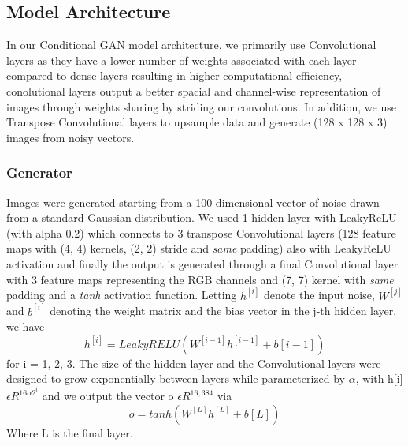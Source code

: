 \documentclass[conference]{IEEEtran}
\begin{document}
\subsection{Model Architecture}
In our Conditional GAN model architecture, we primarily use Convolutional layers as they have a lower number of weights associated with each layer compared to dense layers resulting in higher computational efficiency, conolutional layers output a better spacial and channel-wise representation of images through weights sharing by striding our convolutions. In addition, we use Transpose Convolutional layers to upsample data and generate (128 x 128 x 3) images from noisy vectors. 


\subsubsection{Generator}%
Images were generated starting from a 100-dimensional vector of noise drawn from a standard Gaussian distribution. We used 1 hidden layer with LeakyReLU (with alpha 0.2) which connects to 3 transpose Convolutional layers (128 feature maps with (4, 4) kernels, (2, 2) stride and \textit{same} padding) also with LeakyReLU activation and finally the output is generated through a final Convolutional layer with 3 feature maps representing the RGB channels and (7, 7) kernel with \textit{same} padding and a \textit{tanh} activation function. Letting \begin{math}h^[i]\end{math} denote the input noise, \begin{math}W^{[j]}\end{math} and \begin{math}b^{[i]}\end{math} denoting the weight matrix and the bias vector in the j-th hidden layer, we have
\begin{equation}
h^{[i]} = LeakyRELU(W^{[i-1]}h^{[i-1]}+b{[i-1]})\label{Gen LeakyRELU}
\end{equation}
for i = 1, 2, 3. The size of the hidden layer and the Convolutional layers were designed to grow exponentially between layers while parameterized
by \begin{math}\alpha \end{math}, with h[i] \begin{math}\epsilon R^{16\alpha2^i}\end{math} and we output the vector o \begin{math}\epsilon R^{16,384}\end{math} via
\begin{equation}
o =tanh(W^{[L]}h^{[L]}+b{[L]})
\end{equation}
Where L is the final layer.
\end{document}
